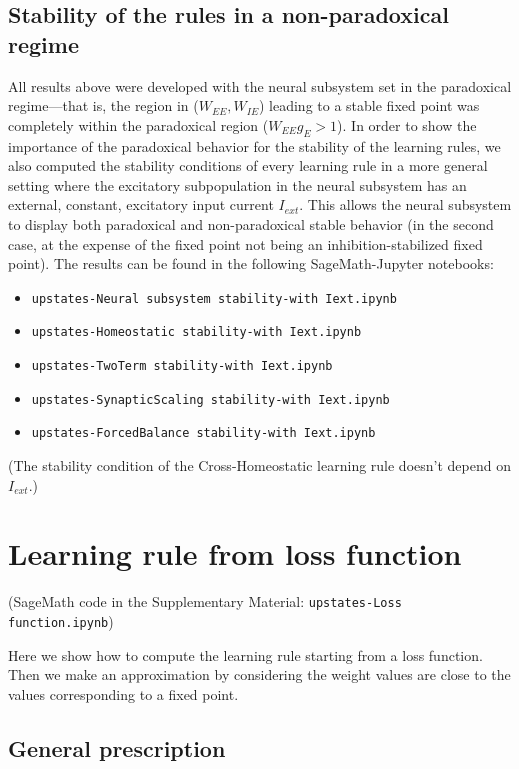\documentclass[twocolumn]{article}
\newcommand{\EE}{\mathit{EE}}
\newcommand{\IE}{\mathit{IE}}
\newcommand{\ext}{\mathit{ext}}
\begin{document}
\subsection{Stability of the rules in a non-paradoxical regime}
\label{sec.nonparadoxical}

All results above were developed with the neural subsystem set in the paradoxical regime---that is, the region in ($W_{\EE},W_{\IE}$) leading to a stable fixed point was completely within the paradoxical region ($W_{\EE}g_E > 1$). In order to show the importance of the paradoxical behavior for the stability of the learning rules, we also computed the stability conditions of every learning rule in a more general setting where the excitatory subpopulation in the neural subsystem has an external, constant, excitatory input current $I_{\ext}$. This allows the neural subsystem to display both paradoxical and non-paradoxical stable behavior (in the second case, at the expense of the fixed point not being an inhibition-stabilized fixed point). The results can be found in the following SageMath-Jupyter notebooks:
\begin{itemize}
\item[] {\tt upstates-Neural subsystem stability-with Iext.ipynb}
\item[] {\tt upstates-Homeostatic stability-with Iext.ipynb}
\item[] {\tt upstates-TwoTerm stability-with Iext.ipynb}
\item[] {\tt upstates-SynapticScaling stability-with Iext.ipynb}
\item[] {\tt upstates-ForcedBalance stability-with Iext.ipynb}
\end{itemize}

\noindent (The stability condition of the Cross-Homeostatic learning rule doesn't depend on $I_{\ext}$.)



\section{Learning rule from loss function}

(SageMath code in the Supplementary Material: {\tt upstates-Loss function.ipynb})

Here we show how to compute the learning rule starting from a loss function. Then we make an approximation by considering the weight values are close to the values corresponding to a fixed point.


\subsection{General prescription}
\end{document}

